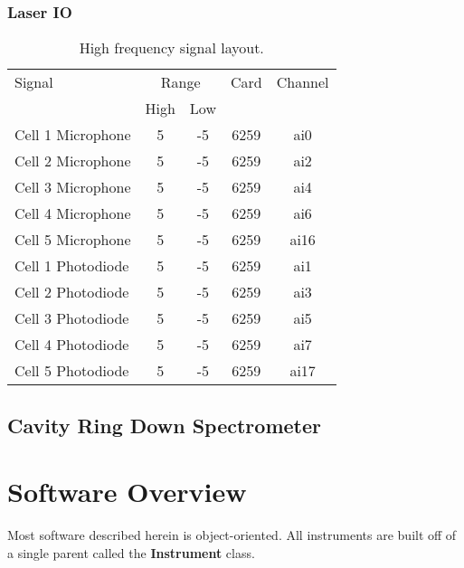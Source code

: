 \documentclass[10pt,twocolumn, twoside, openright]{article}
\begin{document}
\subsubsection{Laser IO}
%

%
\begin{table*}[tb]
	\centering
		\begin{tabular}{lcccc}
		\hline
		Signal & \multicolumn{2}{c}{Range} & Card & Channel\\
		& High & Low &&\\
			\hline\hline
			Cell 1 Microphone & 5 & -5 & 6259 & ai0\\
			Cell 2 Microphone & 5 & -5 & 6259 & ai2\\
			Cell 3 Microphone & 5 & -5 & 6259 & ai4\\
			Cell 4 Microphone & 5 & -5 & 6259 & ai6\\
			Cell 5 Microphone & 5 & -5 & 6259 & ai16\\
			Cell 1 Photodiode & 5 & -5 & 6259 & ai1\\
			Cell 2 Photodiode & 5 & -5 & 6259 & ai3\\
			Cell 3 Photodiode & 5 & -5 & 6259 & ai5\\
			Cell 4 Photodiode & 5 & -5 & 6259 & ai7\\
			Cell 5 Photodiode & 5 & -5 & 6259 & ai17\\
			\hline
		\end{tabular}
	\caption{High frequency signal layout.}
	\label{tab:HFsig}
\end{table*}
\subsection{Cavity Ring Down Spectrometer}

\section{Software Overview}
%
Most software described herein is object-oriented.  All instruments are built off of a single parent called the \textbf{Instrument} class.\par
%
\end{document}
